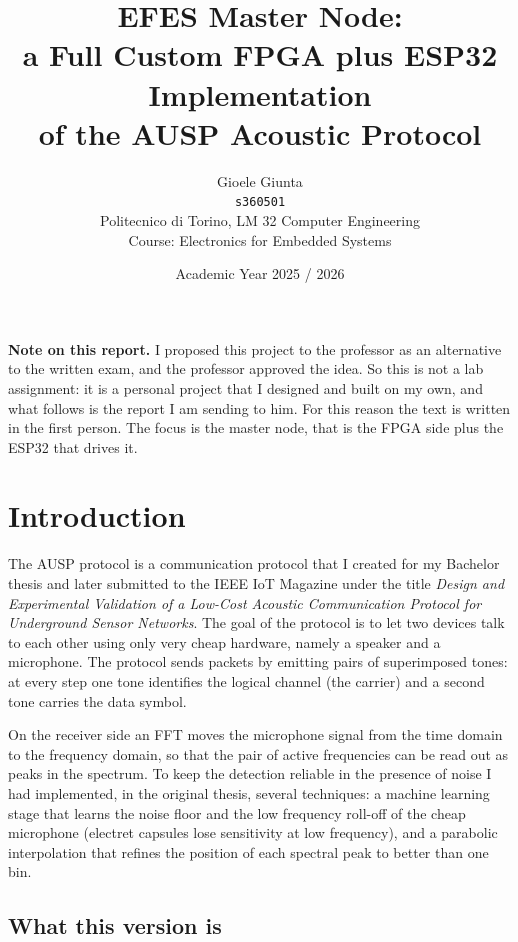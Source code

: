 \documentclass[a4paper,11pt]{article}
\title{\textbf{EFES Master Node:\\a Full Custom FPGA plus ESP32 Implementation\\of the AUSP Acoustic Protocol}}
\author{Gioele Giunta \\ \texttt{s360501} \\[4pt] \small Politecnico di Torino, LM 32 Computer Engineering \\ \small Course: Electronics for Embedded Systems}
\date{Academic Year 2025 / 2026}
\begin{document}
\maketitle
\thispagestyle{empty}

\noindent\textbf{Note on this report.} I proposed this project to the professor as an
alternative to the written exam, and the professor approved the idea. So this is
not a lab assignment: it is a personal project that I designed and built on my
own, and what follows is the report I am sending to him. For this reason the text
is written in the first person. The focus is the master node, that is the FPGA
side plus the ESP32 that drives it.

\tableofcontents
\newpage

\section{Introduction}

The AUSP protocol is a communication protocol that I created for my Bachelor
thesis and later submitted to the IEEE IoT Magazine under the title
\emph{Design and Experimental Validation of a Low-Cost Acoustic Communication
Protocol for Underground Sensor Networks}. The goal of the protocol is to let
two devices talk to each other using only very cheap hardware, namely a speaker
and a microphone. The protocol sends packets by emitting pairs of superimposed
tones: at every step one tone identifies the logical channel (the carrier) and a
second tone carries the data symbol.

On the receiver side an FFT moves the microphone signal from the time domain to
the frequency domain, so that the pair of active frequencies can be read out as
peaks in the spectrum. To keep the detection reliable in the presence of noise I
had implemented, in the original thesis, several techniques: a machine learning
stage that learns the noise floor and the low frequency roll-off of the cheap
microphone (electret capsules lose sensitivity at low frequency), and a parabolic
interpolation that refines the position of each spectral peak to better than one
bin.

\subsection{What this version is}
\end{document}
